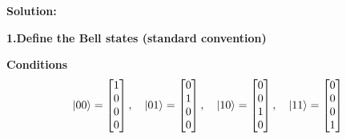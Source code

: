 \documentclass[11pt]{article}
\newenvironment{solution}
{\par\noindent\textbf{Solution:}\par}
{\vspace{1em}}
\begin{document}
\begin{solution}

\textbf{1.Define the Bell states (standard convention)}


\textbf{Conditions}
\[
\ket{00} = \begin{bmatrix}1\\0\\0\\0\end{bmatrix},\quad
\ket{01} = \begin{bmatrix}0\\1\\0\\0\end{bmatrix},\quad
\ket{10} = \begin{bmatrix}0\\0\\1\\0\end{bmatrix},\quad
\ket{11} = \begin{bmatrix}0\\0\\0\\1\end{bmatrix}
\]


\end{solution}
\end{document}
